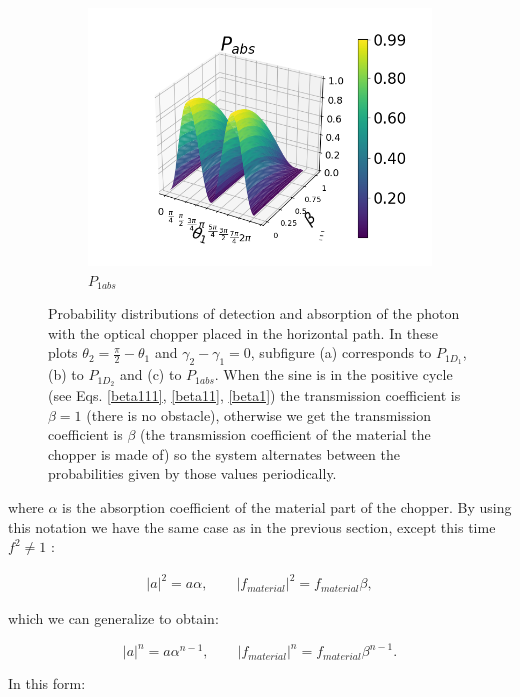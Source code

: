\documentclass[12pt]{book}
\begin{document}
\begin{figure}[t!]
\begin{subfigure}[b]{0.4\linewidth}
\includegraphics[width=\linewidth]{images/PAbs_v.png}
\caption{$P_{1abs}$}
\label{fig:BS1}
\end{subfigure}
\caption{Probability distributions of detection and absorption of the photon with the optical chopper placed in the horizontal path. In these plots $\theta_{2}=\frac{\pi}{2}-\theta_{1}$ and $\gamma_{2}-\gamma_{1}=0$, subfigure (a) corresponds to $P_{1D_{1}}$, (b) to $P_{1D_{2}}$ and (c) to $P_{1abs}$. When the sine is in the positive cycle (see Eqs. \ref{beta111}, \ref{beta11}, \ref{beta1})  the transmission coefficient is $\beta=1$ (there is no obstacle), otherwise we get the transmission coefficient is $\beta$ (the transmission coefficient of the material the chopper is made of) so the system alternates between the probabilities given by those values periodically.}
\label{P3chopper}
\end{figure}

where $\alpha$ is the absorption coefficient of the material part of the chopper. By using this notation we have the same case as in the previous section, except this time $f^2 \neq 1$ :

\begin{align}
|a|^2=a \alpha,\qquad |f_{material}|^2=f_{material} \beta,
\end{align}

which we can generalize to obtain:

\begin{equation}
|a|^n=a\alpha^{n-1},\qquad|f_{material}|^n=f_{material} \beta^{n-1}.
\end{equation}

In this form:
\end{document}
